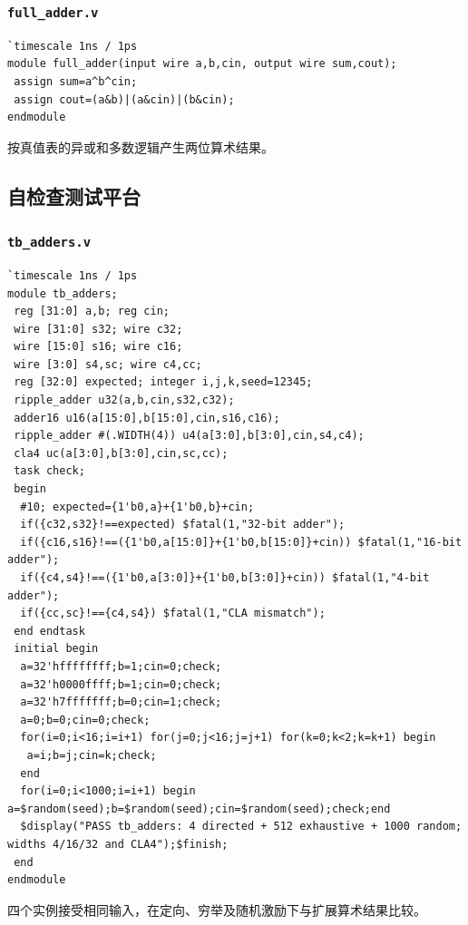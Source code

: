 \documentclass[12pt,a4paper]{ctexart}
\begin{document}
\subsubsection*{\texttt{full\_adder.v}}
\begin{lstlisting}
`timescale 1ns / 1ps
module full_adder(input wire a,b,cin, output wire sum,cout);
 assign sum=a^b^cin;
 assign cout=(a&b)|(a&cin)|(b&cin);
endmodule
\end{lstlisting}
按真值表的异或和多数逻辑产生两位算术结果。

\subsection*{自检查测试平台}
\subsubsection*{\texttt{tb\_adders.v}}
\begin{lstlisting}
`timescale 1ns / 1ps
module tb_adders;
 reg [31:0] a,b; reg cin;
 wire [31:0] s32; wire c32;
 wire [15:0] s16; wire c16;
 wire [3:0] s4,sc; wire c4,cc;
 reg [32:0] expected; integer i,j,k,seed=12345;
 ripple_adder u32(a,b,cin,s32,c32);
 adder16 u16(a[15:0],b[15:0],cin,s16,c16);
 ripple_adder #(.WIDTH(4)) u4(a[3:0],b[3:0],cin,s4,c4);
 cla4 uc(a[3:0],b[3:0],cin,sc,cc);
 task check;
 begin
  #10; expected={1'b0,a}+{1'b0,b}+cin;
  if({c32,s32}!==expected) $fatal(1,"32-bit adder");
  if({c16,s16}!==({1'b0,a[15:0]}+{1'b0,b[15:0]}+cin)) $fatal(1,"16-bit adder");
  if({c4,s4}!==({1'b0,a[3:0]}+{1'b0,b[3:0]}+cin)) $fatal(1,"4-bit adder");
  if({cc,sc}!=={c4,s4}) $fatal(1,"CLA mismatch");
 end endtask
 initial begin
  a=32'hffffffff;b=1;cin=0;check;
  a=32'h0000ffff;b=1;cin=0;check;
  a=32'h7fffffff;b=0;cin=1;check;
  a=0;b=0;cin=0;check;
  for(i=0;i<16;i=i+1) for(j=0;j<16;j=j+1) for(k=0;k<2;k=k+1) begin
   a=i;b=j;cin=k;check;
  end
  for(i=0;i<1000;i=i+1) begin a=$random(seed);b=$random(seed);cin=$random(seed);check;end
  $display("PASS tb_adders: 4 directed + 512 exhaustive + 1000 random; widths 4/16/32 and CLA4");$finish;
 end
endmodule
\end{lstlisting}
四个实例接受相同输入，在定向、穷举及随机激励下与扩展算术结果比较。
\end{document}

